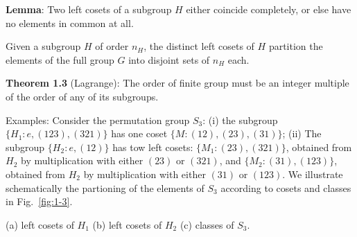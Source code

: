 \textbf{Lemma}: Two left cosets of a subgroup $H$ either coincide completely, or else have no elements in common at all.

Given a subgroup $H$ of order $n_{H}$, the distinct left cosets of $H$ partition the elements of the full group $G$ into disjoint sets of $n_{H}$ each.

\textbf{Theorem 1.3} (Lagrange): The order of finite group must be an integer multiple of the order of any of its subgroups.

\textrm{Examples}: Consider the permutation group $S_{3}$: (i) the subgroup $\{H_{1} : e, \left(123\right), \left(321\right)\}$ has one coset $\{M: \left(12\right),\left(23\right),\left(31\right)\}$; (ii) The subgroup $\{H_{2} : e, \left(12\right)\}$ has tow left cosets: $\{M_{1}: \left(23\right),\left(321\right)\}$, obtained from $H_{2}$ by multiplication with either $\left(23\right)$ or $\left(321\right)$, and $\{M_{2}: \left(31\right),\left(123\right)\}$, obtained from $H_{2}$ by multiplication with either $\left(31\right)$ or $\left(123\right)$. We illustrate schematically the partioning of the elements of $S_{3}$ according to cosets and classes in Fig.~\ref{fig:1-3}.
\begin{marginfigure}
  \centering
  \caption{(a) left cosets of $H_1$ (b) left cosets of $H_2$ (c) classes of $S_3$.}
  \label{fig:1-3}
\end{marginfigure}

